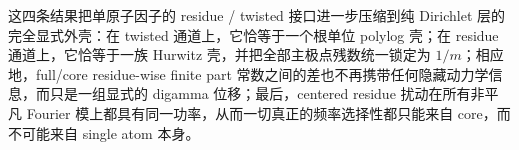 \noindent
这四条结果把单原子因子的 residue / twisted 接口进一步压缩到纯 Dirichlet 层的完全显式外壳：在 twisted 通道上，它恰等于一个根单位 polylog 壳；在 residue 通道上，它恰等于一族 Hurwitz 壳，并把全部主极点残数统一锁定为 \(1/m\)；相应地，full/core residue-wise finite part 常数之间的差也不再携带任何隐藏动力学信息，而只是一组显式的 digamma 位移；最后，centered residue 扰动在所有非平凡 Fourier 模上都具有同一功率，从而一切真正的频率选择性都只能来自 core，而不可能来自 single atom 本身。



\endinput
